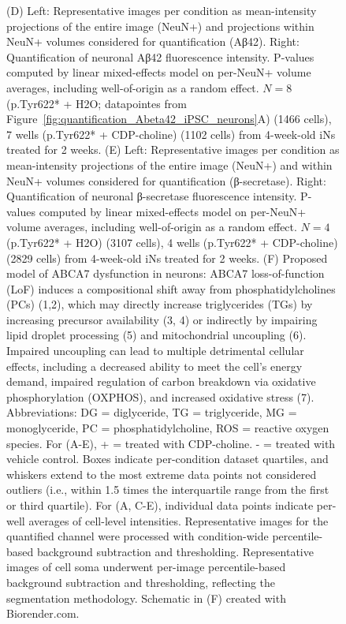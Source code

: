 \begin{figure}[ht]
{        (D) Left: Representative images per condition as mean-intensity projections of the entire image (NeuN+) and projections within NeuN+ volumes considered for quantification (Aβ42). Right: Quantification of neuronal Aβ42 fluorescence intensity. P-values computed by linear mixed-effects model on per-NeuN+ volume averages, including well-of-origin as a random effect. $N = 8$ (p.Tyr622* + H2O; datapointes from Figure~\ref{fig:quantification_Abeta42_iPSC_neurons}A) (1466 cells), 7 wells (p.Tyr622* + CDP-choline) (1102 cells) from 4-week-old iNs treated for 2 weeks. 
        (E) Left: Representative images per condition as mean-intensity projections of the entire image (NeuN+) and within NeuN+ volumes considered for quantification (β-secretase). Right: Quantification of neuronal β-secretase fluorescence intensity. P-values computed by linear mixed-effects model on per-NeuN+ volume averages, including well-of-origin as a random effect. $N = 4$ (p.Tyr622* + H2O) (3107 cells), 4 wells (p.Tyr622* + CDP-choline) (2829 cells) from 4-week-old iNs treated for 2 weeks. 
        (F) Proposed model of ABCA7 dysfunction in neurons: ABCA7 loss-of-function (LoF) induces a compositional shift away from phosphatidylcholines (PCs) (1,2), which may directly increase triglycerides (TGs) by increasing precursor availability (3, 4) or indirectly by impairing lipid droplet processing (5) and mitochondrial uncoupling (6). Impaired uncoupling can lead to multiple detrimental cellular effects, including a decreased ability to meet the cell’s energy demand, impaired regulation of carbon breakdown via oxidative phosphorylation (OXPHOS), and increased oxidative stress (7). Abbreviations: DG = diglyceride, TG = triglyceride, MG = monoglyceride, PC = phosphatidylcholine, ROS = reactive oxygen species. For (A-E),  + = treated with CDP-choline. - = treated with vehicle control. Boxes indicate per-condition dataset quartiles, and whiskers extend to the most extreme data points not considered outliers (i.e., within 1.5 times the interquartile range from the first or third quartile). For (A, C-E), individual data points indicate per-well averages of cell-level intensities. Representative images for the quantified channel were processed with condition-wide percentile-based background subtraction and thresholding. Representative images of cell soma underwent per-image percentile-based background subtraction and thresholding, reflecting the segmentation methodology. Schematic in (F) created with Biorender.com.
    }
    \label{fig:main_choline}
\end{figure}
